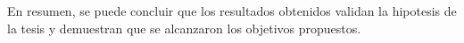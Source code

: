 \begin{conclusions}
	En resumen, se puede concluir que los resultados obtenidos validan la hipotesis de la tesis y demuestran que se alcanzaron los objetivos propuestos. 
	
	
	

	


%
%
%
%

\end{conclusions}
